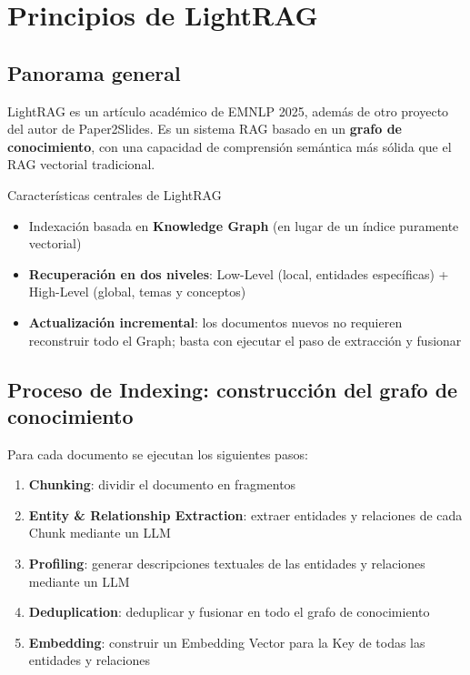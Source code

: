 \section{Principios de LightRAG}

\subsection{Panorama general}

LightRAG es un artículo académico de EMNLP 2025, además de otro proyecto del autor de Paper2Slides. Es un sistema RAG basado en un \textbf{grafo de conocimiento}, con una capacidad de comprensión semántica más sólida que el RAG vectorial tradicional.

\begin{importantbox}{Características centrales de LightRAG}
\begin{itemize}
    \item Indexación basada en \textbf{Knowledge Graph} (en lugar de un índice puramente vectorial)
    \item \textbf{Recuperación en dos niveles}: Low-Level (local, entidades específicas) + High-Level (global, temas y conceptos)
    \item \textbf{Actualización incremental}: los documentos nuevos no requieren reconstruir todo el Graph; basta con ejecutar el paso de extracción y fusionar
\end{itemize}
\end{importantbox}

\subsection{Proceso de Indexing: construcción del grafo de conocimiento}

Para cada documento se ejecutan los siguientes pasos:

\begin{enumerate}
    \item \textbf{Chunking}: dividir el documento en fragmentos
    \item \textbf{Entity \& Relationship Extraction}: extraer entidades y relaciones de cada Chunk mediante un LLM
    \item \textbf{Profiling}: generar descripciones textuales de las entidades y relaciones mediante un LLM
    \item \textbf{Deduplication}: deduplicar y fusionar en todo el grafo de conocimiento
    \item \textbf{Embedding}: construir un Embedding Vector para la Key de todas las entidades y relaciones
\end{enumerate}

